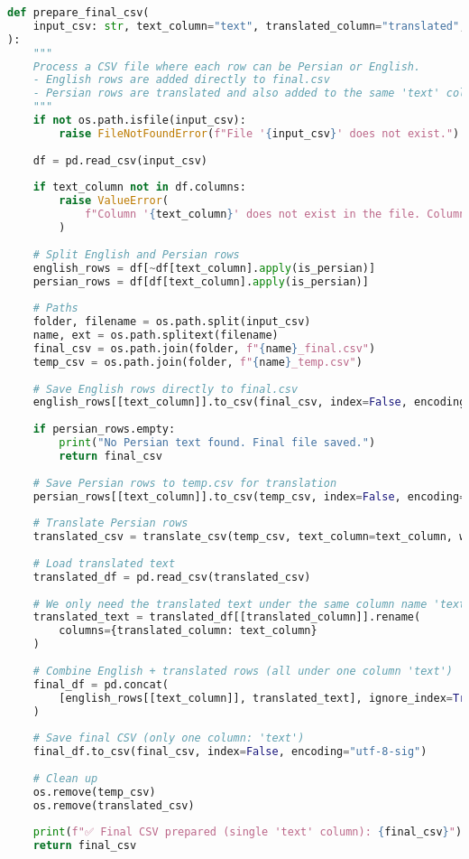 \documentclass{article}
\begin{document}
\begin{latin}
\begin{lstlisting}[language=Python]
def prepare_final_csv(
    input_csv: str, text_column="text", translated_column="translated", workers=2
):
    """
    Process a CSV file where each row can be Persian or English.
    - English rows are added directly to final.csv
    - Persian rows are translated and also added to the same 'text' column
    """
    if not os.path.isfile(input_csv):
        raise FileNotFoundError(f"File '{input_csv}' does not exist.")
    
    df = pd.read_csv(input_csv)
    
    if text_column not in df.columns:
        raise ValueError(
            f"Column '{text_column}' does not exist in the file. Columns: {df.columns.tolist()}"
        )
    
    # Split English and Persian rows
    english_rows = df[~df[text_column].apply(is_persian)]
    persian_rows = df[df[text_column].apply(is_persian)]
    
    # Paths
    folder, filename = os.path.split(input_csv)
    name, ext = os.path.splitext(filename)
    final_csv = os.path.join(folder, f"{name}_final.csv")
    temp_csv = os.path.join(folder, f"{name}_temp.csv")
    
    # Save English rows directly to final.csv
    english_rows[[text_column]].to_csv(final_csv, index=False, encoding="utf-8-sig")
    
    if persian_rows.empty:
        print("No Persian text found. Final file saved.")
        return final_csv
    
    # Save Persian rows to temp.csv for translation
    persian_rows[[text_column]].to_csv(temp_csv, index=False, encoding="utf-8-sig")
    
    # Translate Persian rows
    translated_csv = translate_csv(temp_csv, text_column=text_column, workers=workers)
    
    # Load translated text
    translated_df = pd.read_csv(translated_csv)
    
    # We only need the translated text under the same column name 'text'
    translated_text = translated_df[[translated_column]].rename(
        columns={translated_column: text_column}
    )
    
    # Combine English + translated rows (all under one column 'text')
    final_df = pd.concat(
        [english_rows[[text_column]], translated_text], ignore_index=True
    )
    
    # Save final CSV (only one column: 'text')
    final_df.to_csv(final_csv, index=False, encoding="utf-8-sig")
    
    # Clean up
    os.remove(temp_csv)
    os.remove(translated_csv)
    
    print(f"✅ Final CSV prepared (single 'text' column): {final_csv}")
    return final_csv
\end{lstlisting}
\end{latin}
\end{document}
